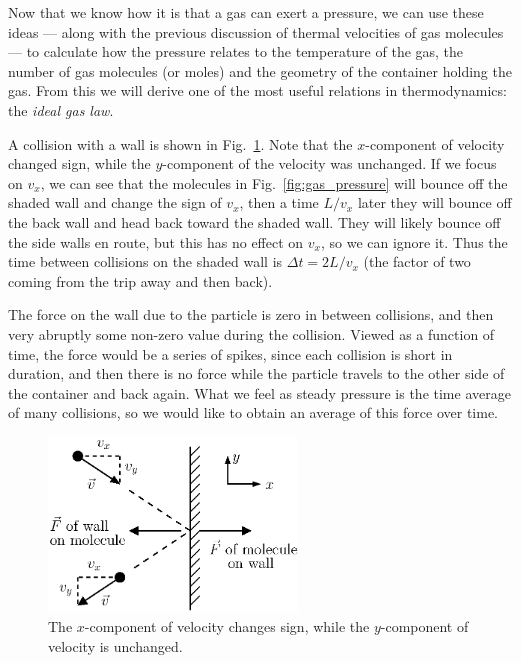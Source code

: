 Now that we know how it is that a gas can exert a pressure, we
can use these ideas --- along with the previous discussion of
thermal velocities of gas molecules --- to calculate how the
pressure relates to the temperature of the gas, the number of gas
molecules (or moles) and the geometry of the container holding the
gas.  From this we will derive one of the most useful 
relations in thermodynamics: the {\em ideal gas law}.

 A collision with a wall is shown in Fig.~\ref{fig:collide_wall}.
 Note that the $x$-component of velocity changed sign, while the
 $y$-component of the velocity was unchanged.  If we focus on $v_x$,
 we can see that the molecules in Fig.~\ref{fig:gas_pressure} will
 bounce off the shaded wall and change the sign of $v_x$, then a time
 $L/v_x$ later they will bounce off the back wall and head back toward
 the shaded wall.  They will likely bounce off the side walls en
 route, but this has no effect on $v_x$, so we can ignore it.  Thus
 the time between collisions on the shaded wall is $\Delta t = 2L/v_x$
 (the factor of two coming from the trip away and then back).


The force on the wall due to the particle is zero in between
collisions, and then very abruptly some non-zero value during the
collision.  Viewed as a function of time, the force would be a series
of spikes, since each collision is short in duration, and then there
is no force while the particle travels to the other side of the
container and back again. What we feel as steady pressure is the time
average of many collisions, so we would like to obtain an average of
this force over time.  


\begin{figure}
\begin{center}
\includegraphics[width=2.6in]{liquids_and_gases/collide_wall.eps}
\caption{The $x$-component of velocity changes sign, while the $y$-component
of velocity is unchanged.}
\label{fig:collide_wall}
\end{center}
\end{figure}

